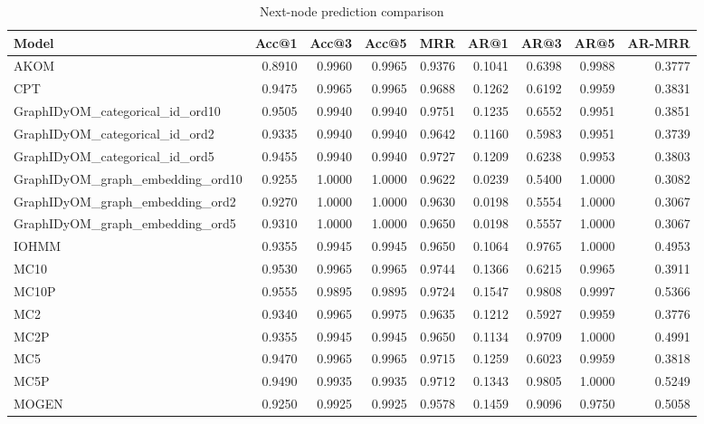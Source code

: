 \begin{table}
\caption{Next-node prediction comparison}
\label{tab:comparison}
\begin{tabular}{lrrrrrrrr}
\toprule
Model & Acc@1 & Acc@3 & Acc@5 & MRR & AR@1 & AR@3 & AR@5 & AR-MRR \\
\midrule
AKOM & 0.8910 & 0.9960 & 0.9965 & 0.9376 & 0.1041 & 0.6398 & 0.9988 & 0.3777 \\
CPT & 0.9475 & 0.9965 & 0.9965 & 0.9688 & 0.1262 & 0.6192 & 0.9959 & 0.3831 \\
GraphIDyOM_categorical_id_ord10 & 0.9505 & 0.9940 & 0.9940 & 0.9751 & 0.1235 & 0.6552 & 0.9951 & 0.3851 \\
GraphIDyOM_categorical_id_ord2 & 0.9335 & 0.9940 & 0.9940 & 0.9642 & 0.1160 & 0.5983 & 0.9951 & 0.3739 \\
GraphIDyOM_categorical_id_ord5 & 0.9455 & 0.9940 & 0.9940 & 0.9727 & 0.1209 & 0.6238 & 0.9953 & 0.3803 \\
GraphIDyOM_graph_embedding_ord10 & 0.9255 & 1.0000 & 1.0000 & 0.9622 & 0.0239 & 0.5400 & 1.0000 & 0.3082 \\
GraphIDyOM_graph_embedding_ord2 & 0.9270 & 1.0000 & 1.0000 & 0.9630 & 0.0198 & 0.5554 & 1.0000 & 0.3067 \\
GraphIDyOM_graph_embedding_ord5 & 0.9310 & 1.0000 & 1.0000 & 0.9650 & 0.0198 & 0.5557 & 1.0000 & 0.3067 \\
IOHMM & 0.9355 & 0.9945 & 0.9945 & 0.9650 & 0.1064 & 0.9765 & 1.0000 & 0.4953 \\
MC10 & 0.9530 & 0.9965 & 0.9965 & 0.9744 & 0.1366 & 0.6215 & 0.9965 & 0.3911 \\
MC10P & 0.9555 & 0.9895 & 0.9895 & 0.9724 & 0.1547 & 0.9808 & 0.9997 & 0.5366 \\
MC2 & 0.9340 & 0.9965 & 0.9975 & 0.9635 & 0.1212 & 0.5927 & 0.9959 & 0.3776 \\
MC2P & 0.9355 & 0.9945 & 0.9945 & 0.9650 & 0.1134 & 0.9709 & 1.0000 & 0.4991 \\
MC5 & 0.9470 & 0.9965 & 0.9965 & 0.9715 & 0.1259 & 0.6023 & 0.9959 & 0.3818 \\
MC5P & 0.9490 & 0.9935 & 0.9935 & 0.9712 & 0.1343 & 0.9805 & 1.0000 & 0.5249 \\
MOGEN & 0.9250 & 0.9925 & 0.9925 & 0.9578 & 0.1459 & 0.9096 & 0.9750 & 0.5058 \\
\bottomrule
\end{tabular}
\end{table}
